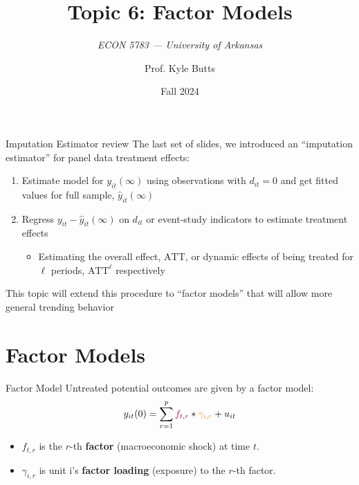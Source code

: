\documentclass[aspectratio=169,t,11pt,table]{beamer}
\title{Topic 6: Factor Models}
\subtitle{\it  ECON 5783 — University of Arkansas}
\date{Fall 2024}
\author{Prof. Kyle Butts}
\begin{document}
\begin{frame}
\maketitle

\end{frame}

\begin{frame}{Imputation Estimator review}
  The last set of slides, we introduced an ``imputation estimator'' for panel data treatment effects:

  \begin{enumerate}
    \item Estimate model for $y_{it}(\infty)$ using observations with $d_{it} = 0$ and get fitted values for full sample, $\hat{y}_{it}(\infty)$
    
    \item Regress $y_{it} - \hat{y}_{it}(\infty)$ on $d_{it}$ or event-study indicators to estimate treatment effects
    \begin{itemize}
      \item Estimating the overall effect, $\text{ATT}$, or dynamic effects of being treated for $\ell$ periods, $\text{ATT}^\ell$ respectively
    \end{itemize}
  \end{enumerate}
  
  \pause
  \bigskip
  This topic will extend this procedure to ``factor models'' that will allow more general trending behavior
\end{frame}

\section{Factor Models}

\begin{frame}{Factor Model}
  Untreated potential outcomes are given by a factor model:
  $$
    y_{it}(0) = \sum_{r = 1}^{p} {\color{purple}f_{t,r}} * {\color{orange}\gamma_{i,r}} + u_{it}
  $$

  \begin{itemize}
    \item $f_{t, r}$ is the $r$-th \textbf{\color{purple} factor} (macroeconomic shock) at time $t$.
    \item $\gamma_{i,r}$ is unit i's \textbf{\color{orange} factor loading} (exposure) to the $r$-th factor.
  \end{itemize}
\end{frame}
\end{document}
